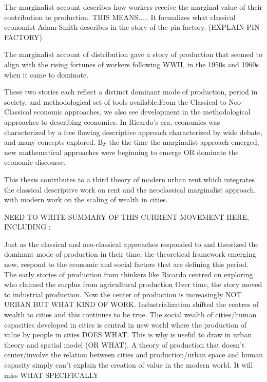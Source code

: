 The marginalist account describes how workers receive the marginal value of their contribution to production. THIS MEANS.....
It formalizes what classical economist Adam Smith describes in the story of the pin factory. (EXPLAIN PIN FACTORY)

The marginalist account of distribution gave a story of production that seemed to align with the rising fortunes of workers following WWII, in the 1950s and 1960s when it came to dominate. 

These two stories each reflect a distinct dominant mode of production, period in society, and methodological set of tools available.From the Classical to Neo-Classical economic approaches, we also see development in the methodological approaches to describing economies. In Ricardo's era, economics was characterized by a free flowing descriptive approach characterized by wide debate, and many concepts explored. By the the time the marginalist approach emerged, new mathematical approaches were beginning to emerge OR dominate the economic discourse. 

This thesis contributes to a third theory of modern urban rent which integrates the classical descriptive work on rent and the neoclassical marginalist approach, with modern work on the scaling of wealth in cities. 


 NEED TO WRITE SUMMARY OF THIS CURRENT MOVEMENT HERE, INCLUDING
:

Just as the classical and neo-classical approaches responded to and theorized the dominant mode of production in their time, the theoretical framework emerging now, respond to the economic and social factors that are defining this period.  The early stories of production from thinkers like Ricardo centred on exploring who claimed the surplus from agricultural production Over time, the story moved to industrial production. Now the center of production is increasingly NOT URBAN BUT WHAT KIND OF WORK. Industrialization shifted the centres of wealth to cities and this continues to be true.  The social wealth of cities/human capacities developed in cities is central in new world where the production of value by people in cities DOES WHAT.
This is why is useful to draw in urban theory and spatial model (OR WHAT). A theory of production that doesn't center/involve the relation between cities and production/urban space and human capacity simply can't explain the creation of value in the modern world. It will miss WHAT SPECIFICALLY 






